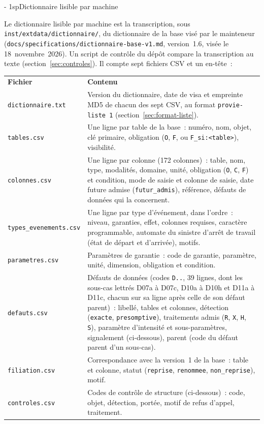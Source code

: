 \documentclass[a4paper,11pt]{article}
\makeatletter
\newcommand{\titrebandeau}[1]{%
  \noindent{\color{financeblue}\rule{\linewidth}{2.5pt}}
  \par\vspace{5mm}
  {\color{greenline}\raggedright\fontsize{19}{23}\bfseries\selectfont #1\par}
  \vspace{6mm}}
\newcommand{\charte@bandeau}[1]{%
  \parindent\z@ \everypar{\strut}%
  {\strut\par}\nobreak
  \titrebandeau{#1}\nobreak
  \kern\z@\nobreak\strut\par}
\newcommand{\charte@reserve}[1]{\par\ifinner\else\if@nobreak\else
  \penalty\z@ %
  \begingroup\setlength{\dimen@}{#1}%
  \dimen@ii\pagegoal \advance\dimen@ii-\pagetotal
  \ifdim\pagegoal=\maxdimen\else\ifdim\dimen@>\dimen@ii
    \vfil\penalty-\@M %
  \fi\fi\endgroup\fi\fi}
\renewcommand{\section}{\charte@reserve{12\baselineskip}%
  \@startsection{section}{1}{\z@}%
  {\z@}{1sp}{\normalfont\charte@bandeau}}
\newcommand{\code}[1]{\texttt{\small #1}}
\makeatother
\begin{document}
\section{Dictionnaire lisible par machine}
\label{sec:dictionnaire-csv}

Le dictionnaire lisible par machine est la transcription, sous
\code{inst/extdata/dictionnaire/}, du dictionnaire de la base visé par le
mainteneur (\code{docs/specifications/dictionnaire-base-v1.md}, version~1.6,
visée le 18~novembre~2026). Un script de contrôle du dépôt compare la
transcription au texte (section~\ref{sec:controles}). Il compte sept
fichiers CSV et un en-tête~:

\begin{center}
\small
{}
\begin{tabular}{@{}p{3.9cm}p{11.2cm}@{}}
\rowcolor{tableheader}
\textcolor{financeblue}{\textbf{Fichier}} & \textcolor{financeblue}{\textbf{Contenu}} \\
\code{dictionnaire.txt} & Version du dictionnaire, date de visa et empreinte MD5 de chacun des sept CSV, au format \code{provie-liste 1} (section~\ref{sec:format-liste}). \\
\code{tables.csv} & Une ligne par table de la base~: numéro, nom, objet, clé primaire, obligation (\code{O}, \code{F}, ou \code{F\_si:<table>}), visibilité. \\
\code{colonnes.csv} & Une ligne par colonne (172 colonnes)~: table, nom, type, modalités, domaine, unité, obligation (\code{O}, \code{C}, \code{F}) et condition, mode de saisie et colonne de saisie, date future admise (\code{futur\_admis}), référence, défauts de données qui la concernent. \\
\code{types\_evenements.csv} & Une ligne par type d'événement, dans l'ordre~: niveau, garanties, effet, colonnes requises, caractère programmable, automate du sinistre d'arrêt de travail (état de départ et d'arrivée), motifs. \\
\code{parametres.csv} & Paramètres de garantie~: code de garantie, paramètre, unité, dimension, obligation et condition. \\
\code{defauts.csv} & Défauts de données (codes \code{D..}, 39 lignes, dont les sous-cas lettrés D07a à D07c, D10a à D10h et D11a à D11c, chacun sur sa ligne après celle de son défaut parent)~: libellé, tables et colonnes, détection (\code{exacte}, \code{presomptive}), traitements admis (\code{R}, \code{X}, \code{H}, \code{S}), paramètre d'intensité et sous-paramètres, signalement (ci-dessous), parent (code du défaut parent d'un sous-cas). \\
\code{filiation.csv} & Correspondance avec la version~1 de la base~: table et colonne, statut (\code{reprise}, \code{renommee}, \code{non\_reprise}), motif. \\
\code{controles.csv} & Codes de contrôle de structure (ci-dessous)~: code, objet, détection, portée, motif de refus d'appel, traitement. \\
\end{tabular}
\end{center}
\end{document}

